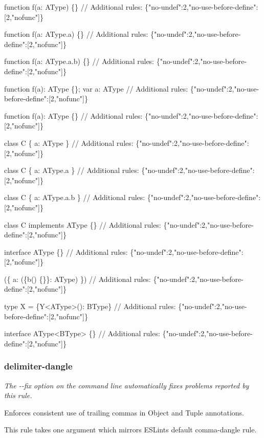 \begin{DoxyCode}
function f(a: AType) \{\}
// Additional rules: \{"no-undef":2,"no-use-before-define":[2,"nofunc"]\}

function f(a: AType.a) \{\}
// Additional rules: \{"no-undef":2,"no-use-before-define":[2,"nofunc"]\}

function f(a: AType.a.b) \{\}
// Additional rules: \{"no-undef":2,"no-use-before-define":[2,"nofunc"]\}

function f(a): AType \{\}; var a: AType
// Additional rules: \{"no-undef":2,"no-use-before-define":[2,"nofunc"]\}

function f(a): AType \{\}
// Additional rules: \{"no-undef":2,"no-use-before-define":[2,"nofunc"]\}

class C \{ a: AType \}
// Additional rules: \{"no-undef":2,"no-use-before-define":[2,"nofunc"]\}

class C \{ a: AType.a \}
// Additional rules: \{"no-undef":2,"no-use-before-define":[2,"nofunc"]\}

class C \{ a: AType.a.b \}
// Additional rules: \{"no-undef":2,"no-use-before-define":[2,"nofunc"]\}

class C implements AType \{\}
// Additional rules: \{"no-undef":2,"no-use-before-define":[2,"nofunc"]\}

interface AType \{\}
// Additional rules: \{"no-undef":2,"no-use-before-define":[2,"nofunc"]\}

(\{ a: (\{b() \{\}\}: AType) \})
// Additional rules: \{"no-undef":2,"no-use-before-define":[2,"nofunc"]\}

type X = \{Y<AType>(): BType\}
// Additional rules: \{"no-undef":2,"no-use-before-define":[2,"nofunc"]\}

interface AType<BType> \{\}
// Additional rules: \{"no-undef":2,"no-use-before-define":[2,"nofunc"]\}
\end{DoxyCode}


\label{_eslint-plugin-flowtype-rules-delimiter-dangle}%
 \subsubsection*{{\ttfamily delimiter-\/dangle}}

{\itshape The {\ttfamily -\/-\/fix} option on the command line automatically fixes problems reported by this rule.}

Enforces consistent use of trailing commas in Object and Tuple annotations.

This rule takes one argument which mirrors E\+S\+Lint\textquotesingle{}s default {\ttfamily comma-\/dangle} rule.

